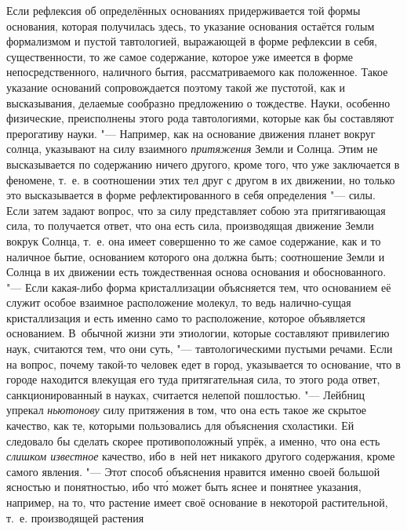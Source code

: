 Если рефлексия об определённых основаниях придерживается той формы основания,
которая получилась здесь, то указание основания остаётся голым формализмом и
пустой тавтологией, выражающей в форме рефлексии в себя, существенности, то же
самое содержание, которое уже имеется в форме непосредственного, наличного
бытия, рассматриваемого как положенное. Такое указание оснований сопровождается
поэтому такой же пустотой, как и высказывания, делаемые сообразно предложению о
тождестве. Науки, особенно физические, преисполнены этого рода тавтологиями,
которые как бы составляют прерогативу науки. "--- Например, как на основание
движения планет вокруг солнца, указывают на силу взаимного {\em притяжения}
Земли и Солнца. Этим не высказывается по содержанию ничего другого, кроме того,
что уже заключается в феномене, т.~е. в соотношении этих тел друг с другом в их
движении, но только это высказывается в форме рефлектированного в себя
определения "--- силы. Если затем задают вопрос, что за силу представляет собою
эта притягивающая сила, то получается ответ, что она есть сила, производящая
движение Земли вокрук Солнца, т.~е. она имеет совершенно то же самое
содержание, как и то наличное бытие, основанием которого она должна быть;
соотношение Земли и Солнца в их движении есть тождественная основа основания и
обоснованного. "--- Если какая-либо форма кристаллизации объясняется тем, что
основанием её служит особое взаимное расположение молекул, то ведь
налично-сущая кристаллизация и есть именно само то расположение, которое
объявляется основанием. В~обычной жизни эти этиологии, которые составляют привилегию наук, считаются тем, что они суть,
"--- тавтологическими пустыми речами. Если на вопрос, почему такой-то человек
едет в город, указывается то основание, что в городе находится влекущая его
туда притягательная сила, то этого рода ответ, санкционированный в науках,
считается нелепой пошлостью. "--- Лейбниц упрекал {\em ньютонову} силу
притяжения в том, что она есть такое же скрытое качество, как те, которыми
пользовались для объяснения схоластики. Ей следовало бы сделать скорее
противоположный упрёк, а именно, что она есть {\em слишком известное} качество,
ибо в~ней нет никакого другого содержания, кроме самого явления. "--- Этот
способ объяснения нравится именно своей большой ясностью и понятностью, ибо
чт\'{о} может быть яснее и понятнее указания, например, на то, что растение
имеет своё основание в некоторой растительной, т.~е. производящей растения
